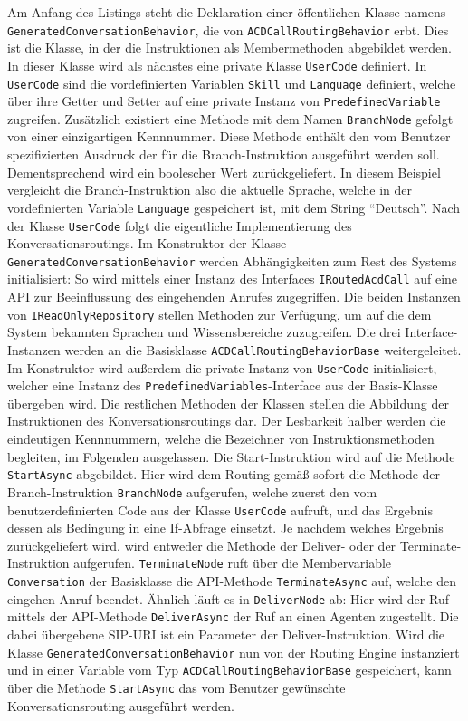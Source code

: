 Am Anfang des Listings steht die Deklaration einer öffentlichen Klasse namens \texttt{GeneratedConversationBehavior}, die von \texttt{ACDCallRoutingBehavior} erbt. Dies ist die Klasse, in der die Instruktionen als Membermethoden abgebildet werden. In dieser Klasse wird als nächstes eine private Klasse \texttt{UserCode} definiert. In \texttt{UserCode} sind die vordefinierten Variablen \texttt{Skill} und \texttt{Language} definiert, welche über ihre Getter und Setter auf eine private Instanz von \texttt{PredefinedVariable} zugreifen. Zusätzlich existiert eine Methode mit dem Namen \texttt{BranchNode} gefolgt von einer einzigartigen Kennnummer. Diese Methode enthält den vom Benutzer spezifizierten Ausdruck der für die Branch-Instruktion ausgeführt werden soll. Dementsprechend wird ein boolescher Wert zurückgeliefert. In diesem Beispiel vergleicht die Branch-Instruktion also die aktuelle Sprache, welche in der vordefinierten Variable \texttt{Language} gespeichert ist, mit dem String ``Deutsch''. 
\newline
Nach der Klasse \texttt{UserCode} folgt die eigentliche Implementierung des Konversationsroutings. Im Konstruktor der Klasse \texttt{GeneratedConversationBehavior} werden Abhängigkeiten zum Rest des Systems initialisiert: So wird mittels einer Instanz des Interfaces \texttt{IRoutedAcdCall} auf eine API zur Beeinflussung des eingehenden Anrufes zugegriffen. Die beiden Instanzen von \texttt{IReadOnlyRepository} stellen Methoden zur Verfügung, um auf die dem System bekannten Sprachen und Wissensbereiche zuzugreifen. Die drei Interface-Instanzen werden an die Basisklasse \texttt{ACDCallRoutingBehaviorBase} weitergeleitet. Im Konstruktor wird außerdem die private Instanz von \texttt{UserCode} initialisiert, welcher eine Instanz des \texttt{PredefinedVariables}-Interface aus der Basis-Klasse übergeben wird. Die restlichen Methoden der Klassen stellen die Abbildung der Instruktionen des Konversationsroutings dar. Der Lesbarkeit halber werden die eindeutigen Kennnummern, welche die Bezeichner von Instruktionsmethoden begleiten, im Folgenden ausgelassen. Die Start-Instruktion wird auf die Methode \texttt{StartAsync} abgebildet. Hier wird dem Routing gemäß sofort die Methode der Branch-Instruktion \texttt{BranchNode} aufgerufen, welche zuerst den vom benutzerdefinierten Code aus der Klasse \texttt{UserCode} aufruft, und das Ergebnis dessen als Bedingung in eine If-Abfrage einsetzt. Je nachdem welches Ergebnis zurückgeliefert wird, wird entweder die Methode der Deliver- oder der Terminate-Instruktion aufgerufen. \texttt{TerminateNode} ruft über die Membervariable \texttt{Conversation} der Basisklasse die API-Methode \texttt{TerminateAsync} auf, welche den eingehen Anruf beendet. Ähnlich läuft es in \texttt{DeliverNode} ab: Hier wird der Ruf mittels der API-Methode \texttt{DeliverAsync} der Ruf an einen Agenten zugestellt. Die dabei übergebene SIP-URI ist ein Parameter der Deliver-Instruktion.
\newline
Wird die Klasse \texttt{GeneratedConversationBehavior} nun von der Routing Engine instanziert und in einer Variable vom Typ \texttt{ACDCallRoutingBehaviorBase} gespeichert, kann über die Methode \texttt{StartAsync} das vom Benutzer gewünschte Konversationsrouting ausgeführt werden.

